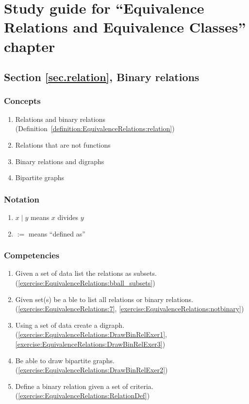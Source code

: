 \section{Study guide  for ``Equivalence Relations and Equivalence Classes''  chapter} \label{sec:EquivalenceRelations:study} 
\subsection*{Section \ref{sec.relation}, Binary relations}
\subsubsection*{Concepts}
\begin{enumerate}
\item 
Relations and binary relations (Definition~\ref{definition:EquivalenceRelations:relation})
\item
Relations that are not functions
\item
Binary relations and digraphs
\item
Bipartite graphs
\end{enumerate}

\subsubsection*{Notation}
\begin{enumerate}
\item
 $x\mid y$ means $x$ divides $y$
\item 
$:=$ means ``defined as''
\end{enumerate}

\subsubsection*{Competencies}
\begin{enumerate}
\item
Given a set of data list the relations as subsets.  (\ref{exercise:EquivalenceRelations:bball_subsets}) 
\item
Given set(s) be a ble to list all relations or binary relations. (\ref{exercise:EquivalenceRelations:7}, \ref{exercise:EquivalenceRelations:notbinary})
\item	
Using a set of data create a digraph. (\ref{exercise:EquivalenceRelations:DrawBinRelExer1}, \ref{exercise:EquivalenceRelations:DrawBinRelExer3})
\item
Be able to draw bipartite graphs. (\ref{exercise:EquivalenceRelations:DrawBinRelExer2})
\item
Define a binary relation given a set of criteria. (\ref{exercise:EquivalenceRelations:RelationDef})
\end{enumerate}


